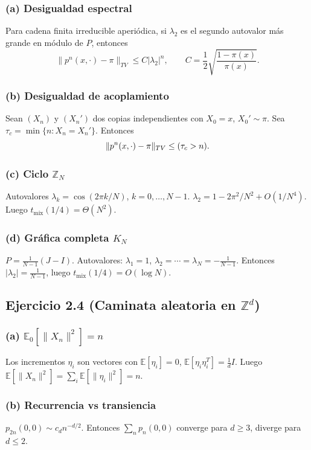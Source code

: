 \documentclass[12pt]{article}
\let\P\relax
\newcommand{\P}{\mathbb{P}}
\newcommand{\E}{\mathbb{E}}
\newcommand{\Z}{\mathbb{Z}}
\newcommand{\1}{\mathbf{1}}
\begin{document}
\subsubsection*{(a) Desigualdad espectral}
Para cadena finita irreducible aperi\'odica, si $\lambda_2$ es el segundo autovalor m\'as grande en m\'odulo de $P$, entonces
\[
\|p^n(x,\cdot)-\pi\|_{TV}\le C|\lambda_2|^n,\qquad C=\frac12\sqrt{\frac{1-\pi(x)}{\pi(x)}}.
\]

\subsubsection*{(b) Desigualdad de acoplamiento}
Sean $(X_n)$ y $(X_n')$ dos copias independientes con $X_0=x$, $X_0'\sim\pi$. Sea $\tau_c=\min\{n:X_n=X_n'\}$. Entonces
\[
\|p^n(x,\cdot)-\pi\|_{TV}\le\P(\tau_c>n).
\]

\subsubsection*{(c) Ciclo $\Z_N$}
Autovalores $\lambda_k=\cos(2\pi k/N)$, $k=0,\dots,N-1$. $\lambda_2=1-2\pi^2/N^2+O(1/N^4)$. Luego $t_{\text{mix}}(1/4)=\Theta(N^2)$.

\subsubsection*{(d) Gr\'afica completa $K_N$}
$P=\frac1{N-1}(J-I)$. Autovalores: $\lambda_1=1$, $\lambda_2=\cdots=\lambda_N=-\frac1{N-1}$. Entonces $|\lambda_2|=\frac1{N-1}$, luego $t_{\text{mix}}(1/4)=O(\log N)$.

\subsection{Ejercicio 2.4 (Caminata aleatoria en $\Z^d$)}

\subsubsection*{(a) $\E_0[\|X_n\|^2]=n$}
Los incrementos $\eta_i$ son vectores con $\E[\eta_i]=0$, $\E[\eta_i\eta_i^T]=\frac1d I$. Luego $\E[\|X_n\|^2]=\sum_i\E[\|\eta_i\|^2]=n$.

\subsubsection*{(b) Recurrencia vs transiencia}
$p_{2n}(0,0)\sim c_d n^{-d/2}$. Entonces $\sum_n p_n(0,0)$ converge para $d\ge3$, diverge para $d\le2$.
\end{document}

